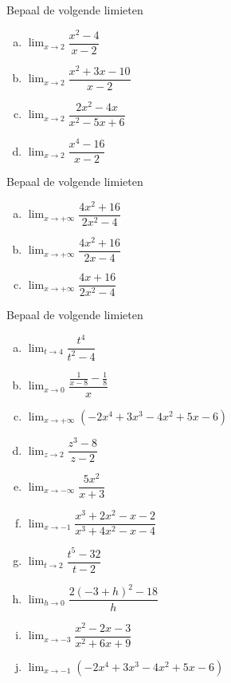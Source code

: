 \documentclass[12pt,twoside,a4paper]{article}
\begin{document}
\begin{oefening}
  Bepaal de volgende limieten
  \begin{multicols}{2}
  \begin{enumerate}[(a)]
  \itemsep1em
  \item $\displaystyle\lim_{x\to 2}\dfrac{x^2-4}{x-2}$
  \item $\displaystyle\lim_{x\to 2}\dfrac{x^2+3x-10}{x-2}$
  \item $\displaystyle\lim_{x\to 2}\dfrac{2x^2-4x}{x^2-5x+6}$
  \item $\displaystyle\lim_{x\to 2}\dfrac{x^4-16}{x-2}$
  \end{enumerate}
  \end{multicols}
\end{oefening}

\begin{oefening}
  Bepaal de volgende limieten
  \begin{multicols}{3}
  \begin{enumerate}[(a)]
  \itemsep1em
  \item $\displaystyle\lim_{x\to +\infty}\dfrac{4x^2+16}{2x^2-4}$
  \item $\displaystyle\lim_{x\to +\infty}\dfrac{4x^2+16}{2x-4}$
  \item $\displaystyle\lim_{x\to +\infty}\dfrac{4x+16}{2x^2-4}$
  \end{enumerate}
  \end{multicols}
\end{oefening}

\begin{oefening}
  Bepaal de volgende limieten
  \begin{multicols}{2}
  \begin{enumerate}[(a)]
  \itemsep1em
  \item $\displaystyle\lim_{t\to 4}\dfrac{t^4}{t^2-4}$
  \item $\displaystyle\lim_{x\to 0}\dfrac{\frac{1}{x-8}-\frac{1}{8}}{x}$
  \item $\displaystyle\lim_{x\to +\infty}\left(-2x^4+3x^3-4x^2+5x-6\right)$
  \item $\displaystyle\lim_{z\to 2}\dfrac{z^3-8}{z-2}$
  \item $\displaystyle\lim_{x\to -\infty}\dfrac{5x^2}{x+3}$
  \item $\displaystyle\lim_{x\to -1}\dfrac{x^3+2x^2-x-2}{x^3+4x^2-x-4}$
  \item $\displaystyle\lim_{t\to 2}\dfrac{t^5-32}{t-2}$
  \item $\displaystyle\lim_{h\to 0}\dfrac{2(-3+h)^2-18}{h}$
  \item $\displaystyle\lim_{x\to -3}\dfrac{x^2-2x-3}{x^2+6x+9}$
  \item $\displaystyle\lim_{x\to -1}\left(-2x^4+3x^3-4x^2+5x-6\right)$
  \end{enumerate}
  \end{multicols}
\end{oefening}
\end{document}

